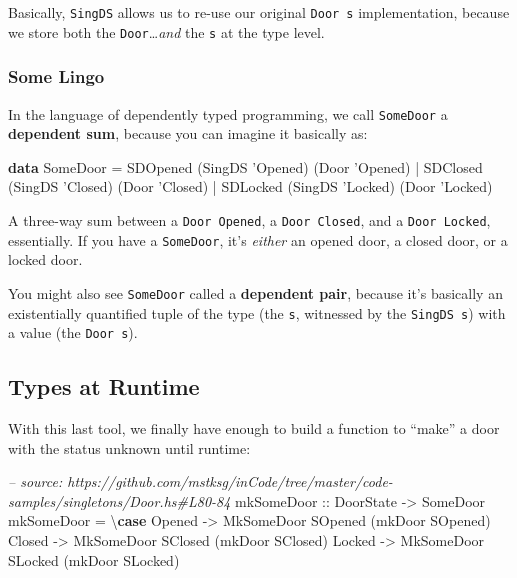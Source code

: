 \documentclass[]{article}
\newenvironment{Shaded}{}{}
\newcommand{\KeywordTok}[1]{\textcolor[rgb]{0.00,0.44,0.13}{\textbf{#1}}}
\newcommand{\DataTypeTok}[1]{\textcolor[rgb]{0.56,0.13,0.00}{#1}}
\newcommand{\CharTok}[1]{\textcolor[rgb]{0.25,0.44,0.63}{#1}}
\newcommand{\CommentTok}[1]{\textcolor[rgb]{0.38,0.63,0.69}{\textit{#1}}}
\newcommand{\OtherTok}[1]{\textcolor[rgb]{0.00,0.44,0.13}{#1}}
\newcommand{\FunctionTok}[1]{\textcolor[rgb]{0.02,0.16,0.49}{#1}}
\newcommand{\NormalTok}[1]{#1}
\begin{document}
Basically, \texttt{SingDS} allows us to re-use our original \texttt{Door\ s}
implementation, because we store both the \texttt{Door}\ldots{}\emph{and} the
\texttt{s} at the type level.

\subsubsection{Some Lingo}\label{some-lingo}

In the language of dependently typed programming, we call \texttt{SomeDoor} a
\textbf{dependent sum}, because you can imagine it basically as:

\begin{Shaded}
\begin{Highlighting}[]
\KeywordTok{data} \DataTypeTok{SomeDoor} \FunctionTok{=} \DataTypeTok{SDOpened}\NormalTok{ (}\DataTypeTok{SingDS} \CharTok{'Opened) (Door '}\DataTypeTok{Opened}\NormalTok{)}
              \FunctionTok{|} \DataTypeTok{SDClosed}\NormalTok{ (}\DataTypeTok{SingDS} \CharTok{'Closed) (Door '}\DataTypeTok{Closed}\NormalTok{)}
              \FunctionTok{|} \DataTypeTok{SDLocked}\NormalTok{ (}\DataTypeTok{SingDS} \CharTok{'Locked) (Door '}\DataTypeTok{Locked}\NormalTok{)}
\end{Highlighting}
\end{Shaded}

A three-way sum between a \texttt{Door\ \textquotesingle{}Opened}, a
\texttt{Door\ \textquotesingle{}Closed}, and a
\texttt{Door\ \textquotesingle{}Locked}, essentially. If you have a
\texttt{SomeDoor}, it's \emph{either} an opened door, a closed door, or a locked
door.

You might also see \texttt{SomeDoor} called a \textbf{dependent pair}, because
it's basically an existentially quantified tuple of the type (the \texttt{s},
witnessed by the \texttt{SingDS\ s}) with a value (the \texttt{Door\ s}).

\subsection{Types at Runtime}\label{types-at-runtime}

With this last tool, we finally have enough to build a function to ``make'' a
door with the status unknown until runtime:

\begin{Shaded}
\begin{Highlighting}[]
\CommentTok{-- source: https://github.com/mstksg/inCode/tree/master/code-samples/singletons/Door.hs#L80-84}
\OtherTok{mkSomeDoor ::} \DataTypeTok{DoorState} \OtherTok{->} \DataTypeTok{SomeDoor}
\NormalTok{mkSomeDoor }\FunctionTok{=}\NormalTok{ \textbackslash{}}\KeywordTok{case}
    \DataTypeTok{Opened} \OtherTok{->} \DataTypeTok{MkSomeDoor} \DataTypeTok{SOpened}\NormalTok{ (mkDoor }\DataTypeTok{SOpened}\NormalTok{)}
    \DataTypeTok{Closed} \OtherTok{->} \DataTypeTok{MkSomeDoor} \DataTypeTok{SClosed}\NormalTok{ (mkDoor }\DataTypeTok{SClosed}\NormalTok{)}
    \DataTypeTok{Locked} \OtherTok{->} \DataTypeTok{MkSomeDoor} \DataTypeTok{SLocked}\NormalTok{ (mkDoor }\DataTypeTok{SLocked}\NormalTok{)}
\end{Highlighting}
\end{Shaded}
\end{document}
